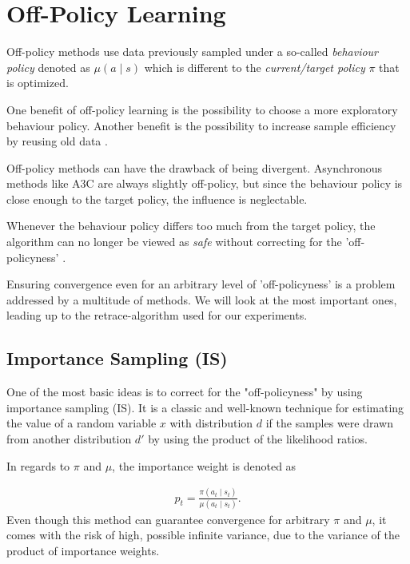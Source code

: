 \pagebreak
\section{Off-Policy Learning}
\raggedbottom 

Off-policy methods use data previously sampled under a so-called \textit{behaviour policy} denoted as $\mu(a \mid s)$  which is different to the \textit{current/target policy}  $\pi$ that is optimized.

One benefit of off-policy learning is the possibility to choose a more exploratory behaviour policy. 
Another benefit is the possibility to increase sample efficiency by reusing old data
\citep{Degris12}.

Off-policy methods can have the drawback of being divergent.
Asynchronous methods like A3C are always slightly off-policy, but since the behaviour policy is close enough to the target policy, the influence is neglectable.

Whenever the behaviour policy differs too much from the target policy, the algorithm can no longer be viewed as \textit{safe} without correcting for the 'off-policyness' \citep{Munos16}.

Ensuring convergence even for an arbitrary level of 'off-policyness' is a problem addressed by a multitude of methods.
We will look at the most important ones, leading up to the retrace-algorithm used for our experiments.

\subsection{Importance Sampling (IS)}

One of the most basic ideas is to correct for the "off-policyness" by using importance sampling (IS).
It is a classic and well-known technique for estimating the value of a random variable $x$ with distribution $d$  if the samples were drawn from another distribution $d'$
by using the product of the likelihood ratios.

In regards to $\pi$ and $\mu$, the importance weight is denoted as

\begin{align}
{
p_t = \frac{\pi (a_t \mid s_t)}{\mu (a_t \mid s_t)}.
}
\label{IW}
\end{align}
Even though this method can guarantee convergence \citep{Munos16} for arbitrary $\pi$ and $\mu$, it comes with the risk of high, possible infinite  variance, due to the variance of the product of importance weights.

